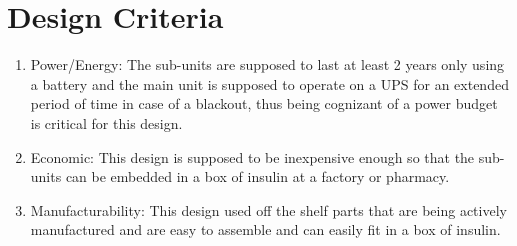\section{Design Criteria}
\begin{enumerate}
  \item Power/Energy: The sub-units are supposed to last at least 2 years only using a battery and the main unit is supposed to operate on a UPS for an extended period of time in case of a blackout, thus being cognizant of a power budget is critical for this design.
  \item Economic: This design is supposed to be inexpensive enough so that the sub-units can be embedded in a box of insulin at a factory or pharmacy.
  \item Manufacturability: This design used off the shelf parts that are being actively manufactured and are easy to assemble and can easily fit in a box of insulin.
\end{enumerate}
